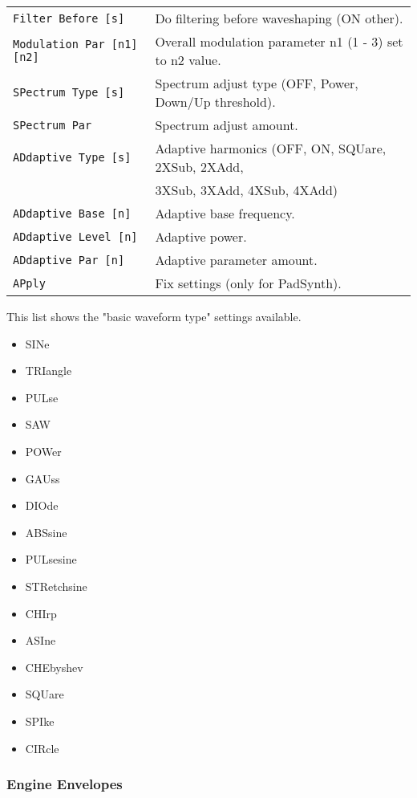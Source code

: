 \begin{table}[H]
\begin{tabular}{l l}
   \texttt{Filter Before [s]} &
      Do filtering before waveshaping (ON other). \\
   \texttt{Modulation Par [n1] [n2]} &
      Overall modulation parameter n1 (1 - 3) set to n2 value. \\
   \texttt{SPectrum Type [s]} &
       Spectrum adjust type (OFF, Power, Down/Up threshold). \\
   \texttt{SPectrum Par } &
      Spectrum adjust amount. \\
   \texttt{ADdaptive Type [s]} &
      Adaptive harmonics (OFF, ON, SQUare, 2XSub, 2XAdd, \\
   \texttt{} &
       3XSub, 3XAdd, 4XSub, 4XAdd) \\
   \texttt{ADdaptive Base [n]} &
      Adaptive base frequency. \\
   \texttt{ADdaptive Level [n]} &
      Adaptive power. \\
   \texttt{ADdaptive Par [n]} &
      Adaptive parameter amount. \\

   \texttt{APply} &
      Fix settings (only for PadSynth). \\

      \end{tabular}
   \end{table}

   This list shows the "basic waveform type" settings available.

   \begin{itemize}
      \item SINe
      \item TRIangle
      \item PULse
      \item SAW
      \item POWer
      \item GAUss
      \item DIOde
      \item ABSsine
      \item PULsesine
      \item STRetchsine
      \item CHIrp
      \item ASIne
      \item CHEbyshev
      \item SQUare
      \item SPIke
      \item CIRcle
   \end{itemize}

\subsubsection{Engine Envelopes}
\label{subsec:command_line_engine_envelopes}

